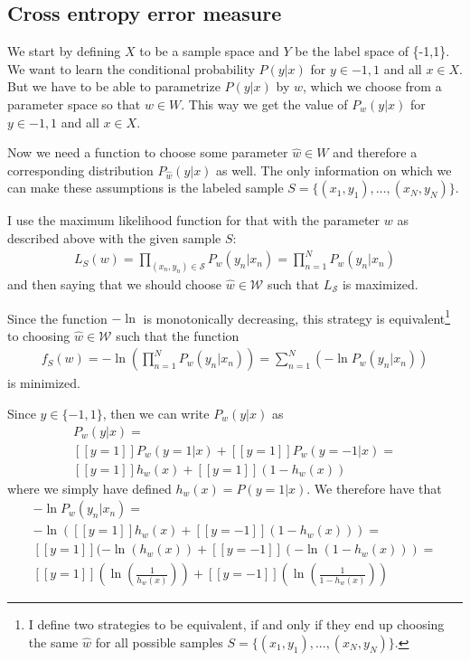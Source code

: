 \subsection{Cross entropy error measure}


We start by defining $X$ to be a sample space and $Y$ be the label space of \{-1,1\}.
We want to learn the conditional probability $P(y|x)$ for $y \in {-1,1}$ and all $x \in X$.
But we have to be able to parametrize $P(y|x)$ by $w$, which we choose from a parameter space so that $w \in W$.
This way we get the value of $P_w(y|x)$ for $y \in -1,1$ and all $x \in X$.

Now we need a function to choose some parameter $\hat{w} \in W$ and therefore a corresponding distribution $P_{\hat{w}}(y|x)$ as well.
The only information on which we can make these assumptions is the labeled sample $S = \{(x_1,y_1),...,(x_N,y_N)\}$. 

I use the maximum likelihood function for that with the parameter $w$ as described above with the given sample $S$:
\begin{align}
L_S(w) = \prod_{(x_n,y_n)\in \mathcal{S}}  P_w(y_n|x_n)
= \prod_{n=1}^N P_w(y_n|x_n)
\end{align}
and then saying that we should choose $\hat{w} \in \mathcal{W}$ such that $L_\mathcal{S}$ is maximized.

Since the function $-\ln$ is monotonically decreasing, this strategy is equivalent\footnote{I define two strategies to be equivalent, if and only if they end up choosing the same $\hat{w}$ for all possible samples $S = \{(x_1,y_1),...,(x_N,y_N)\}$.} to choosing $\hat{w} \in \mathcal{W}$ such that the function
\begin{align}
f_S(w) = -\ln \left( \prod_{n=1}^N P_w(y_n|x_n) \right) = \sum_{n=1}^N \left( - \ln P_w(y_n|x_n) \right)
\end{align}
is minimized. 

Since $y \in \{-1,1\}$, then we can write $P_w(y|x)$ as
\begin{align}
P_w(y|x)  = \\ 
[[y = 1]] P_w(y = 1|x) + [[y = 1]] P_w(y = -1|x) = \\ 
[[y = 1]] h_w(x) + [[y = 1]] (1 - h_w(x))
\end{align}
where we simply have defined $h_w(x) = P(y = 1 | x)$. We therefore have that
\begin{align}
- \ln P_w(y_n|x_n) = \\ 
-\ln ([[y = 1]] h_w(x) + [[y = -1]] (1 - h_w(x))) = \\ 
[[y = 1]](-\ln (h_w(x)) + [[y = -1]](-\ln (1 - h_w(x))) = \\ 
[[y = 1]]\left(\ln \left( \frac{1}{h_w(x)}\right)\right) + [[y = -1]]\left(\ln \left( \frac{1}{1 - h_w(x)}\right)\right)
\end{align}

